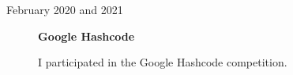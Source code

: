 \documentclass[a4paper,10pt]{article}
\begin{document}
\begin{adjustbox}{valign=t}
\begin{minipage}{0.6\textwidth}
\begin{description}
\item[\normalfont \textcolor{ColorTwo}{February 2020 and 2021}] 
	\textbf{Google Hashcode}\\
	\begin{spacing}{1.1}
		\small
		I participated in the Google Hashcode competition.
	\end{spacing}
	
\end{description}

\end{minipage}
\end{adjustbox}
\end{document}
